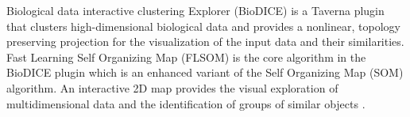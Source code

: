 Biological data interactive clustering Explorer (BioDICE) is a Taverna plugin that clusters high-dimensional biological data and provides a nonlinear, topology preserving projection for the visualization of the input data and their similarities. Fast Learning Self Organizing Map (FLSOM) is the core algorithm in the BioDICE plugin which is an enhanced variant of the Self Organizing Map (SOM) algorithm. An interactive 2D map provides the visual exploration of multidimensional data and the identification of groups of similar objects \cite{2010}. 
